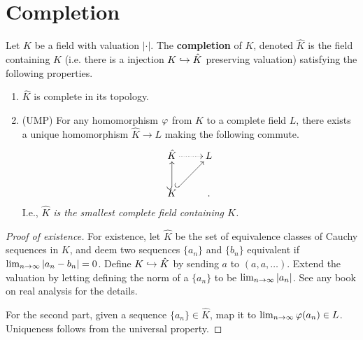 \section{Completion}
\begin{df}
Let $K$ be a field with valuation $|\cdot|$. The \textbf{completion} of $K$, denoted $\hat{K}$ is the field containing $K$ (i.e. there is a injection $K\hookrightarrow \hat{K}$ preserving valuation) satisfying the following properties.
\begin{enumerate}
\item $\hat{K}$ is complete in its topology.
\item (UMP) For any homomorphism $\varphi$ from $K$ to a complete field $L$, there exists a unique homomorphism $\hat{K}\to L$ making the following commute.
\[
\xymatrix{
\hat K\ar@{.>}[r] & L\\
 K\ar@{^(->}[u]\ar@{^(->}[ur]&.
}
\]
I.e., {\it $\hat{K}$ is the smallest complete field containing $K$.}
\end{enumerate}
\end{df}
\begin{proof}[Proof of existence]
For existence, let $\hat{K}$ be the set of equivalence classes of Cauchy sequences in $K$, and deem two sequences $\{a_n\}$ and $\{b_n\}$ equivalent if $\lim_{n\to \infty}|a_n-b_n|=0$. Define $K\hookrightarrow \hat K$ by sending $a$ to $(a,a,\ldots)$. Extend the valuation by letting defining the norm of a $\{a_n\}$ to be $\lim_{n\to \infty} |a_n|$. 
See any book on real analysis for the details. 

For the second part, given a sequence $\{a_n\}\in \hat K$, map it to $\lim_{n\to \infty}\varphi(a_n)\in L$. 
Uniqueness follows from the universal property.
\end{proof}

